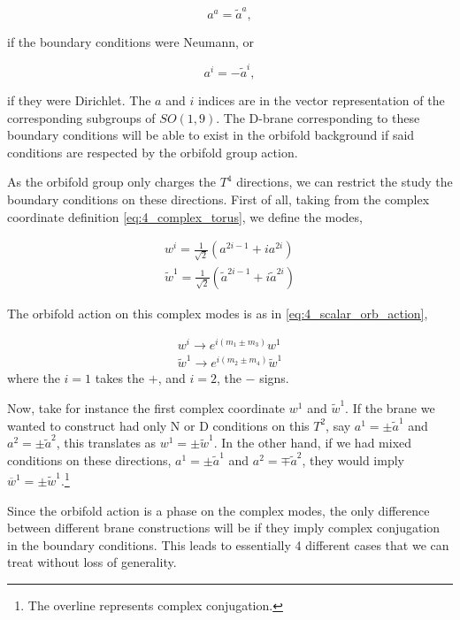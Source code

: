 \begin{equation}
    a^a = \tilde{a}^a,
\end{equation}

if the boundary conditions were Neumann, or

\begin{equation}
    a^i = -\tilde{a}^i,
\end{equation}

if they were Dirichlet. The $a$ and $i$ indices are in the vector representation of the corresponding subgroups of $SO(1,9)$. The D-brane corresponding to these boundary conditions will be able to exist in the orbifold background if said conditions are respected by the orbifold group action.

As the orbifold group only charges the $T^4$ directions, we can restrict the study the boundary conditions on these directions. First of all, taking from the complex coordinate definition \ref{eq:4_complex_torus}, we define the modes,

\begin{align}
    w^i = \frac{1}{\sqrt{2}} (a^{2i-1} + i a^{2i}) \\
    \tilde{w}^1 = \frac{1}{\sqrt{2}} (\tilde{a}^{2i-1} + i \tilde{a}^{2i})
\end{align}

The orbifold action on this complex modes is as in \ref{eq:4_scalar_orb_action},

\begin{equation}
    \begin{aligned}
        w^i \rightarrow e^{i(m_1 \pm m_3)} w^1\\
        \tilde{w}^1 \rightarrow e^{i(m_2 \pm m_4)} \tilde{w}^1
    \end{aligned}
\end{equation}
where the $i = 1$ takes the $+$, and $i = 2$, the $-$ signs.

Now, take for instance the first complex coordinate $w^1$ and $\tilde{w}^1$. If the brane we wanted to construct had only N or D conditions on this $T^2$, say $a^1  = \pm \tilde{a}^1$ and $a^2 = \pm \tilde{a}^2$, this translates as $w^1 = \pm \tilde{w}^1$. In the other hand, if we had mixed conditions on these directions, $a^1 = \pm \tilde{a}^1$ and $a^2 = \mp \tilde{a}^2$, they would imply $\overline{w}^1 = \pm\tilde{w}^1$.\footnote{The overline represents complex conjugation.}

Since the orbifold action is a phase on the complex modes, the only difference between different brane constructions will be if they imply complex conjugation in the boundary conditions. This leads to essentially 4 different cases that we can treat without loss of generality.

